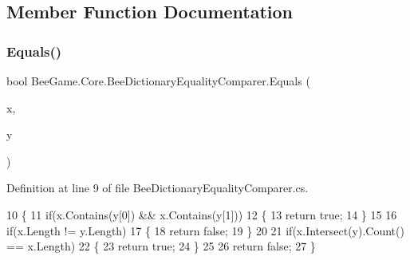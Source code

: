\subsection{Member Function Documentation}
\mbox{\label{class_bee_game_1_1_core_1_1_bee_dictionary_equality_comparer_a04027b45a04e74e25840b185a17c8cba}} 
\subsubsection{\texorpdfstring{Equals()}{Equals()}}
{\footnotesize\ttfamily bool Bee\+Game.\+Core.\+Bee\+Dictionary\+Equality\+Comparer.\+Equals (\begin{DoxyParamCaption}\item[{\hyperlink{namespace_bee_game_1_1_enums_aa2ead984825678d83c42d48f6382619c}{Bee\+Species} \mbox{[}$\,$\mbox{]}}]{x,  }\item[{\hyperlink{namespace_bee_game_1_1_enums_aa2ead984825678d83c42d48f6382619c}{Bee\+Species} \mbox{[}$\,$\mbox{]}}]{y }\end{DoxyParamCaption})}



Definition at line 9 of file Bee\+Dictionary\+Equality\+Comparer.\+cs.


\begin{DoxyCode}
10         \{
11             \textcolor{keywordflow}{if}(x.Contains(y[0]) && x.Contains(y[1]))
12             \{
13                 \textcolor{keywordflow}{return} \textcolor{keyword}{true};
14             \}
15 
16             \textcolor{keywordflow}{if}(x.Length != y.Length)
17             \{
18                 \textcolor{keywordflow}{return} \textcolor{keyword}{false};
19             \}
20             
21             \textcolor{keywordflow}{if}(x.Intersect(y).Count() == x.Length)
22             \{
23                 \textcolor{keywordflow}{return} \textcolor{keyword}{true};
24             \}
25 
26             \textcolor{keywordflow}{return} \textcolor{keyword}{false};
27         \}
\end{DoxyCode}
\mbox{\label{class_bee_game_1_1_core_1_1_bee_dictionary_equality_comparer_acf4f3631aea262ea22aee9eaaffba8f4}} 
